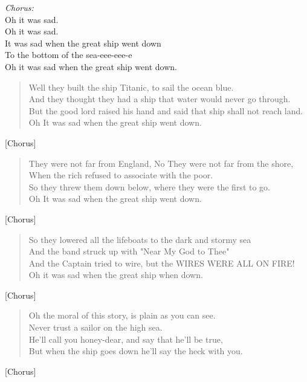 
\begin{center}
\textit{Chorus:} \\
Oh it was sad. \\
Oh it was sad. \\
It was sad when the great ship went down \\
To the bottom of the sea-eee-eee-e \\
Oh it was sad when the great ship went down. \\
\end{center}

\begin{verse}
Well they built the ship Titanic, to sail the ocean blue. \\
And they thought they had a ship that water would never go through. \\
But the good lord raised his hand and said that ship shall not reach land. \\
Oh It was sad when the great ship went down. \\
\end{verse}

[Chorus]

\begin{verse}
They were not far from England, No They were not far from the shore, \\
When the rich refused to associate with the poor. \\
So they threw them down below, where they were the first to go. \\
Oh It was sad when the great ship went down. \\
\end{verse}

[Chorus]

\begin{verse}
So they lowered all the lifeboats to the dark and stormy sea \\
And the band struck up with "Near My God to Thee" \\
And the Captain tried to wire, but the WIRES WERE ALL ON FIRE! \\
Oh it was sad when the great ship when down. \\
\end{verse}

[Chorus]

\begin{verse}
Oh the moral of this story, is plain as you can see. \\
Never trust a sailor on the high sea. \\
He'll call you honey-dear, and say that he'll be true, \\
But when the ship goes down he'll say the heck with you. \\
\end{verse}

[Chorus]
